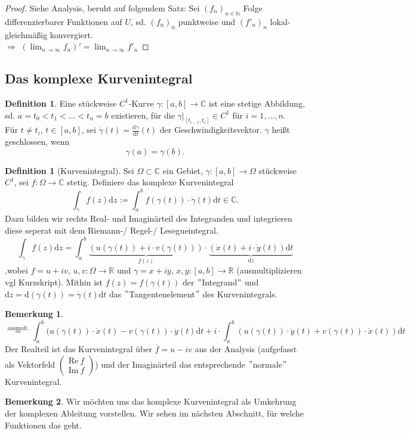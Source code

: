 \documentclass[11pt,titlepage]{article}
\theoremstyle{definition}
\newtheorem{definition}[theorem]{Definition}
\newtheorem{remark}{Bemerkung}
\theoremstyle{remark}
\begin{document}
	\begin{proof}
		Siehe Analysis, beruht auf folgendem Satz: Sei $(f_n)_{n\in\mathbb{N}}$ Folge differenzierbarer 
		Funktionen auf $U$, sd. $(f_n)_n$ punktweise und $(f'_n)_n$ lokal-gleichmäßig konvergiert. \\
		$\Rightarrow$ $(\lim_{n\to\infty} f_n)'=\lim_{n\to\infty}f'_n$
	\end{proof}
	
	\subsection{Das komplexe Kurvenintegral}
	
	\begin{definition}
		Eine stückweise $C^1$-Kurve $\gamma:[a,b]\to\mathbb{C}$ ist eine stetige Abbildung, sd. 
		$a=t_0 < t_1 <\ldots<t_n=b$ existieren, für die $\gamma |_{ [t_{i-1},t_i]}\in C^1$ für 
		$i=1,\ldots ,n$. \\
		Für $t\neq t_i$, $t\in [a,b]$, sei $\dot{\gamma}(t)=\frac{\mathrm{d}\gamma}{\mathrm{d}t}(t)$ der 
		Geschwindigkeitsvektor. $\gamma$ heißt geschlossen, wenn \[\gamma(a)=\gamma(b).\]
	\end{definition}
	
	\begin{definition}[Kurvenintegral]
		Sei $\Omega\subset\mathbb{C}$ ein Gebiet, $\gamma:[a,b]\to\Omega$ stückweise $C^1$, sei 
		$f:\Omega\to\mathbb{C}$ stetig. Definiere das komplexe Kurvenintegral
		\[ \int_{\gamma} f(z)\mathrm{d}z :=\int_a^b f(\gamma(t))\cdot \dot{\gamma}(t) 
		\mathrm{d}t \in \mathbb{C}. \]
		Dazu bilden wir rechts Real- und Imaginärteil des Integranden und 
		integrieren diese seperat mit dem Riemann-/ Regel-/ Lesegueintegral.
		\[ \int_{\gamma} f(z)\mathrm{d}z =\int_a^b \underbrace{(u(\gamma(t))+i\cdot v(\gamma(t)))}_{f(z)}
		\cdot \underbrace{(\dot{x}(t)+i\cdot \dot{y}(t))\mathrm{d}t}_{\mathrm{d}z} \]
		,wobei $f=u+iv$, $u,v:\Omega\to\mathbb{R}$ und $\gamma =x+iy$, $x,y:[a,b]\to\mathbb{R}$ 
		(ausmultiplizieren vgl Kurzskript).  Mithin ist $f(z)=f(\gamma(t))$ der $"$Integrand$"$ und 
		$\mathrm{d}z=\mathrm{d}(\gamma(t))=\dot{\gamma}(t)\mathrm{d}t$ das 
		$"$Tangentenelement$"$ des Kurvenintegrals.
	\end{definition}
	
	\begin{remark}
		\[\overset{\text{ausmult.}}{=} \int_a^b (u(\gamma(t))\cdot \dot{x}(t)-v(\gamma(t))\cdot\dot{y}(t)
		\mathrm{d}t+i\cdot \int_a^b (u(\gamma(t))\cdot \dot{y}(t)+v(\gamma(t))\cdot\dot{x}(t))\mathrm{d}t\]
		Der Realteil ist das Kurvenintegral über $\overline{f}=u-iv$ aus der Analysis (aufgefasst als 
		Vektorfeld $\begin{pmatrix} \text{Re}\ f \\ \text{Im}\ f \end{pmatrix}$) und der Imaginärteil 
		das entsprechende $"$normale$"$ Kurvenintegral.
	\end{remark}
	
	\begin{remark}
		Wir möchten uns das komplexe Kurvenintegral als Umkehrung der komplexen Ableitung 
		vorstellen. Wir sehen im nächsten Abschnitt, für welche Funktionen das geht.
	\end{remark}
\end{document}
